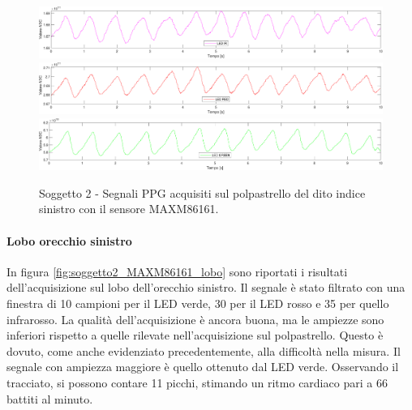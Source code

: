 \begin{figure}[h]
	\centering
	\includegraphics[width=1\linewidth]{ImageFiles/Misure Preliminari/Soggetto 2/maxm86161/polpastrello_ir_moving_avg}
	\includegraphics[width=1\linewidth]{ImageFiles/Misure Preliminari/Soggetto 2/maxm86161/polpastrello_red_moving_avg}
	\includegraphics[width=1\linewidth]{ImageFiles/Misure Preliminari/Soggetto 2/maxm86161/polpastrello_green_moving_avg}
	\caption{Soggetto 2 - Segnali PPG acquisiti sul polpastrello del dito indice sinistro con il sensore MAXM86161.}
	\label{fig:soggetto2_MAXM86161_polpastrello}
\end{figure}

\clearpage

\paragraph{Lobo orecchio sinistro}
In figura \ref{fig:soggetto2_MAXM86161_lobo} sono riportati i risultati dell'acquisizione sul lobo dell'orecchio sinistro. Il segnale è stato filtrato con una finestra di 10 campioni per il LED verde, 30 per il LED rosso e 35 per quello infrarosso. La qualità dell'acquisizione è ancora buona, ma le ampiezze sono inferiori rispetto a quelle rilevate nell'acquisizione sul polpastrello. Questo è dovuto, come anche evidenziato precedentemente, alla difficoltà nella misura. Il segnale con ampiezza maggiore è quello ottenuto dal LED verde. Osservando il tracciato, si possono contare 11 picchi, stimando un ritmo cardiaco pari a 66 battiti al minuto.

